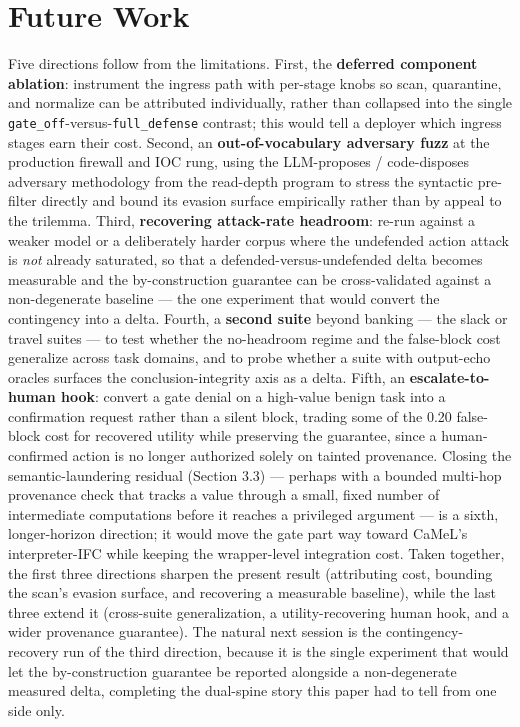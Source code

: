 \documentclass[sigconf,anonymous,review]{acmart}
\begin{document}
\section{Future Work}
Five directions follow from the limitations. First, the \textbf{deferred component ablation}: instrument the ingress path with per-stage knobs so scan, quarantine, and normalize can be attributed individually, rather than collapsed into the single \texttt{gate\_off}-versus-\texttt{full\_defense} contrast; this would tell a deployer which ingress stages earn their cost. Second, an \textbf{out-of-vocabulary adversary fuzz} at the production firewall and IOC rung, using the LLM-proposes / code-disposes adversary methodology from the read-depth program to stress the syntactic pre-filter directly and bound its evasion surface empirically rather than by appeal to the trilemma. Third, \textbf{recovering attack-rate headroom}: re-run against a weaker model or a deliberately harder corpus where the undefended action attack is \textit{not} already saturated, so that a defended-versus-undefended delta becomes measurable and the by-construction guarantee can be cross-validated against a non-degenerate baseline --- the one experiment that would convert the contingency into a delta. Fourth, a \textbf{second suite} beyond banking --- the slack or travel suites --- to test whether the no-headroom regime and the false-block cost generalize across task domains, and to probe whether a suite with output-echo oracles surfaces the conclusion-integrity axis as a delta. Fifth, an \textbf{escalate-to-human hook}: convert a gate denial on a high-value benign task into a confirmation request rather than a silent block, trading some of the 0.20 false-block cost for recovered utility while preserving the guarantee, since a human-confirmed action is no longer authorized solely on tainted provenance. Closing the semantic-laundering residual (Section 3.3) --- perhaps with a bounded multi-hop provenance check that tracks a value through a small, fixed number of intermediate computations before it reaches a privileged argument --- is a sixth, longer-horizon direction; it would move the gate part way toward CaMeL's interpreter-IFC while keeping the wrapper-level integration cost. Taken together, the first three directions sharpen the present result (attributing cost, bounding the scan's evasion surface, and recovering a measurable baseline), while the last three extend it (cross-suite generalization, a utility-recovering human hook, and a wider provenance guarantee). The natural next session is the contingency-recovery run of the third direction, because it is the single experiment that would let the by-construction guarantee be reported alongside a non-degenerate measured delta, completing the dual-spine story this paper had to tell from one side only.
\end{document}
